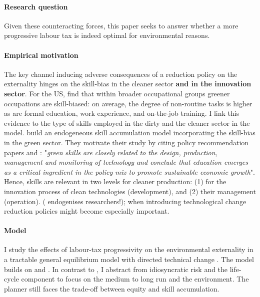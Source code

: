 \paragraph{Research question}
Given these counteracting forces, this paper seeks to answer whether a more progressive labour tax is indeed optimal for environmental reasons. 

\paragraph{Empirical motivation}
The key channel inducing adverse consequences of a reduction policy on the externality hinges on the skill-bias in the cleaner sector \textbf{and in the innovation sector}. %
For the US, \cite{Consoli2016DoCapital} find that within broader occupational groups greener occupations are skill-biased: on average, the degree of non-routine tasks is higher as are formal education, work experience, and on-the-job training. I link this evidence to the type of skills employed in the dirty and the cleaner sector in the model. %
\cite{Borissov2019CarbonDevelopment}
build an endogeneous skill accumulation model incorporating the skill-bias in the green sector. They motivate their study by citing policy recommendation papers and \cite{Vona2018EnvironmentalExploration}: "\textit{green skills are closely related to the design, production, management and monitoring of technology and conclude that education emerges as a critical ingredient in the policy mix to promote sustainable economic growth}". Hence, skills are relevant in two levels for cleaner production: (1) for the innovation process of clean technologies (development), and (2) their management (operation). (\cite{Fried2018ClimateAnalysis} endogenises researchers!); \ar when introducing technological change reduction policies might become especially important. 

\paragraph{Model}
I study the effects of labour-tax progressivity  on the environmental externality in a tractable general equilibrium model with directed technical change . The model builds on \cite{Heathcote2017OptimalFramework} and \cite{Acemoglu2012TheChange}.
In contrast to \cite{Heathcote2017OptimalFramework}, I abstract from idiosyncratic risk and the life-cycle component to focus on the medium to long run and the environment. 
The planner still faces the trade-off between equity and skill accumulation. 

